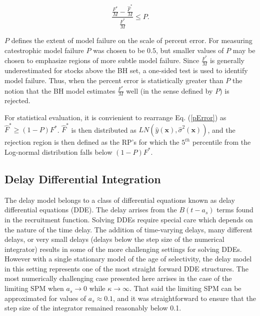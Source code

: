 %
\begin{equation}
\frac{\frac{F^*}{M}-\frac{\hat{F}^*}{M}}{\frac{F^*}{M}}\le P. \label{pError}
\end{equation}

%
$P$ defines the extent of model failure on the scale of percent error. For
measuring catestrophic model failure $P$ was chosen to be $0.5$, but smaller values
of $P$ may be chosen to emphasize regions of more subtle model failure. %
%
Since $\frac{F^*}{M}$ is generally underestimated for stocks above the BH set, a 
one-sided test is used to identify model failure.
Thus, when the percent error is statistically greater than $P$ the notion that
the BH model estimates $\frac{F^*}{M}$ well (in the sense defined by $P$) is rejected.

%
For statistical evaluation, it is convienient to rearrange Eq. (\ref{pError})
as \mbox{$\hat{F}^*\ge (1-P)F^*$}. $\hat{F}^*$ is then distributed as $LN(\hat y(\textbf{x}), \hat \sigma^2(\textbf{x}))$,
and the rejection region is then defined as the RP's for which the $5^{th}$ percentile
from the Log-normal distribution falls below \mbox{$(1-P)F^*$.}

%
\subsection{Delay Differential Integration}

%
The delay model belongs to a class of differential equations known as delay
differential equations (DDE). The delay arrises from the $B(t-a_s)$ terms
found in the recruitment function. Solving DDEs require special care which
depends on the nature of the time delay. The addition of time-varying delays,
many different delays, or very small delays (delays below the step size of the
numerical integrator) results in some of the more challenging settings for
solving DDEs. However with a single stationary model of the age of selectivity,
the delay model in this setting represents one of the most straight forward
DDE structures. The most numerically challenging case presented here arrises
in the case of the limiting SPM when $a_s\to0$ while $\kappa\to\infty$.
That said the limiting SPM can be approximated for values of
$a_s\approx0.1$, and it was straightforward to ensure that the step size of
the integrator remained reasonably below 0.1.

